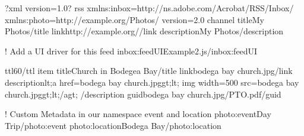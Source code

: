\documentclass[letterpaper,12pt,english,openany,oneside]{sphinxmanual}
\begin{document}
\begin{sphinxVerbatim}[commandchars=\\\{\}]
\PYGZlt{}?xml version=\PYGZdq{}1.0\PYGZdq{}?\PYGZgt{}
\PYGZlt{}rss xmlns:inbox=\PYGZdq{}http://ns.adobe.com/Acrobat/RSS/Inbox/\PYGZdq{}
xmlns:photo=\PYGZdq{}http://example.org/Photos/\PYGZdq{} version=\PYGZdq{}2.0\PYGZdq{}\PYGZgt{}
   \PYGZlt{}channel\PYGZgt{}
       \PYGZlt{}title\PYGZgt{}My Photos\PYGZlt{}/title\PYGZgt{}
       \PYGZlt{}link\PYGZgt{}http://example.org/\PYGZlt{}/link\PYGZgt{}
       \PYGZlt{}description\PYGZgt{}My Photos\PYGZlt{}/description\PYGZgt{}

       \PYGZlt{}!\PYGZhy{}\PYGZhy{} Add a UI driver for this feed \PYGZhy{}\PYGZhy{}\PYGZgt{}
       \PYGZlt{}inbox:feedUI\PYGZgt{}Example2.js\PYGZlt{}/inbox:feedUI\PYGZgt{}

       \PYGZlt{}ttl\PYGZgt{}60\PYGZlt{}/ttl\PYGZgt{}
       \PYGZlt{}item\PYGZgt{}
           \PYGZlt{}title\PYGZgt{}Church in Bodegea Bay\PYGZlt{}/title\PYGZgt{}
           \PYGZlt{}link\PYGZgt{}bodega bay church.jpg\PYGZlt{}/link\PYGZgt{}
           \PYGZlt{}description\PYGZgt{}\PYGZam{}lt;a href=\PYGZdq{}bodega bay church.jpg\PYGZdq{}\PYGZam{}gt;\PYGZam{}lt;
               img width=500
               src=\PYGZdq{}bodega bay church.jpg\PYGZdq{}\PYGZam{}gt;\PYGZam{}lt;/a\PYGZam{}gt;
           \PYGZlt{}/description\PYGZgt{}
           \PYGZlt{}guid\PYGZgt{}bodega bay church.jpg/PTO.pdf\PYGZlt{}/guid\PYGZgt{}

           \PYGZlt{}!\PYGZhy{}\PYGZhy{} Custom Metadata in our namespace \PYGZhy{} event and location \PYGZhy{}\PYGZhy{}\PYGZgt{}
           \PYGZlt{}photo:event\PYGZgt{}Day Trip\PYGZlt{}/photo:event\PYGZgt{}
           \PYGZlt{}photo:location\PYGZgt{}Bodega Bay\PYGZlt{}/photo:location\PYGZgt{}


\end{sphinxVerbatim}
\end{document}
